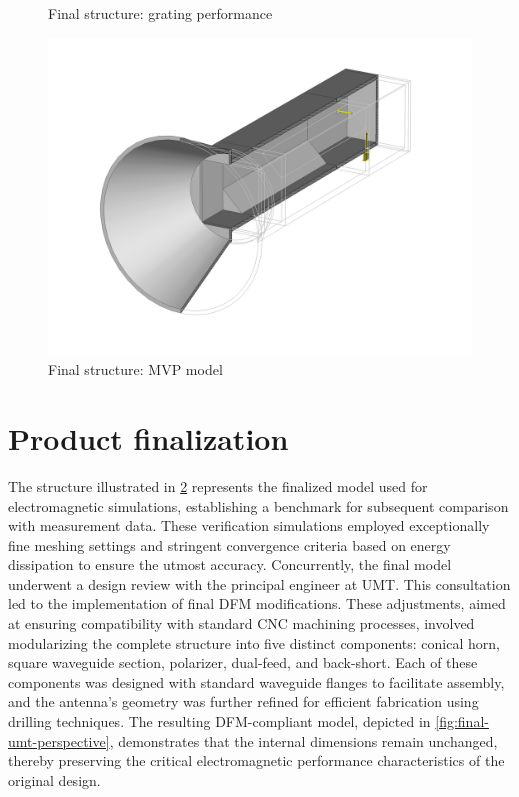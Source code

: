 \documentclass[14pt,a4paper]{ntust_report}
\begin{document}
\begin{figure}[!ht]
    \centering
    
    \caption{\label{fig:grating-vs-mvp-sparameters}Final structure: grating performance}
\end{figure}

\begin{figure}[!ht]
    \centering
    \includegraphics[width=.9\textwidth]{src/final_perspective.png}
    \caption{\label{fig:final-perspective}Final structure: MVP model}
\end{figure}

\section{Product finalization}
The structure illustrated in \cref{fig:final-perspective} represents the finalized model used for electromagnetic simulations, establishing a benchmark for subsequent comparison with measurement data. These verification simulations employed exceptionally fine meshing settings and stringent convergence criteria based on energy dissipation to ensure the utmost accuracy. Concurrently, the final model underwent a design review with the principal engineer at UMT. This consultation led to the implementation of final DFM modifications. These adjustments, aimed at ensuring compatibility with standard CNC machining processes, involved modularizing the complete structure into five distinct components: conical horn, square waveguide section, polarizer, dual-feed, and back-short. Each of these components was designed with standard waveguide flanges to facilitate assembly, and the antenna's geometry was further refined for efficient fabrication using drilling techniques. The resulting DFM-compliant model, depicted in \cref{fig:final-umt-perspective}, demonstrates that the internal dimensions remain unchanged, thereby preserving the critical electromagnetic performance characteristics of the original design.
\end{document}
